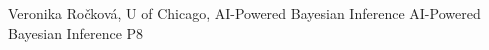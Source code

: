 {}	%
{}		%
{Veronika Ročková, U of Chicago, AI-Powered Bayesian Inference}	%
{AI-Powered Bayesian Inference}		%
{P8}		%
\\\hline
